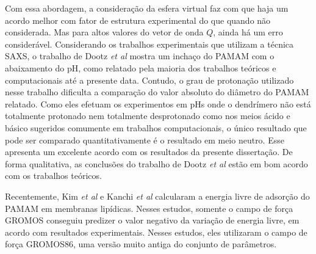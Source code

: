 Com essa abordagem, a consideração da esfera virtual faz com que haja um acordo melhor com fator de estrutura experimental do que quando não considerada.
Mas para altos valores do vetor de onda $Q$, ainda há um erro considerável.
Considerando os trabalhos experimentais que utilizam a técnica SAXS, o trabalho de Dootz \textit{et al}\cite{Dootz2011} mostra um inchaço do PAMAM com o abaixamento do pH, como relatado pela maioria dos trabalhos teóricos e computacionais até a presente data.
Contudo, o grau de protonação utilizado nesse trabalho dificulta a comparação do valor absoluto do diâmetro do PAMAM relatado.
Como eles efetuam os experimentos em pHs onde o dendrímero não está totalmente protonado nem totalmente desprotonado como nos meios ácido e básico sugeridos comumente em trabalhos computacionais, o único resultado que pode ser comparado quantitativamente é o resultado em meio neutro.
Esse apresenta um excelente acordo com os resultados da presente dissertação.
De forma qualitativa, as conclusões do trabalho de Dootz \textit{et al}\cite{Dootz2011} estão em bom acordo com os trabalhos teóricos.

Recentemente, Kim \textit{et al}\cite{Kim2014} e Kanchi \textit{et al}\cite{Kanchi2018} calcularam a energia livre de adsorção do PAMAM em membranas lipídicas.
Nesses estudos, somente o campo de força GROMOS conseguiu predizer o valor negativo da variação de energia livre, em acordo com resultados experimentais.
Nesses estudos, eles utilizaram o campo de força GROMOS86, uma versão muito antiga do conjunto de parâmetros.

